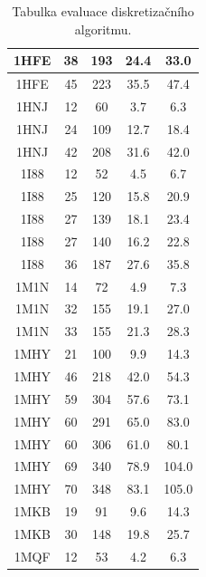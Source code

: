 \begin{table}[htbp]
\begin{tabular}{||c | c c c c||}
        \hline
        1HFE & 38 & 193 & 24.4 & 33.0 \\
        \hline
        1HFE & 45 & 223 & 35.5 & 47.4 \\
        \hline
        1HNJ & 12 & 60 & 3.7 & 6.3 \\
        \hline
        1HNJ & 24 & 109 & 12.7 & 18.4 \\
        \hline
        1HNJ & 42 & 208 & 31.6 & 42.0 \\
        \hline
        1I88 & 12 & 52 & 4.5 & 6.7 \\
        \hline
        1I88 & 25 & 120 & 15.8 & 20.9 \\
        \hline
        1I88 & 27 & 139 & 18.1 & 23.4 \\
        \hline
        1I88 & 27 & 140 & 16.2 & 22.8 \\
        \hline
        1I88 & 36 & 187 & 27.6 & 35.8 \\
        \hline
        1M1N & 14 & 72 & 4.9 & 7.3 \\
        \hline
        1M1N & 32 & 155 & 19.1 & 27.0 \\
        \hline
        1M1N & 33 & 155 & 21.3 & 28.3 \\
        \hline
        1MHY & 21 & 100 & 9.9 & 14.3 \\
        \hline
        1MHY & 46 & 218 & 42.0 & 54.3 \\
        \hline
        1MHY & 59 & 304 & 57.6 & 73.1 \\
        \hline
        1MHY & 60 & 291 & 65.0 & 83.0 \\
        \hline
        1MHY & 60 & 306 & 61.0 & 80.1 \\
        \hline
        1MHY & 69 & 340 & 78.9 & 104.0 \\
        \hline
        1MHY & 70 & 348 & 83.1 & 105.0 \\
        \hline
        1MKB & 19 & 91 & 9.6 & 14.3 \\
        \hline
        1MKB & 30 & 148 & 19.8 & 25.7 \\
        \hline
        1MQF & 12 & 53 & 4.2 & 6.3 \\
        \hline
    \end{tabular}
    \caption{Tabulka evaluace diskretizačního algoritmu.}
\end{table}
